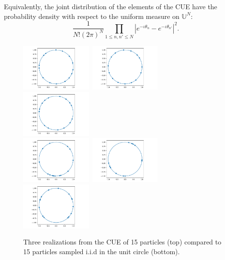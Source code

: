 \documentclass[twoside,11pt]{book}
\numberwithin{theorem}{chapter}
\numberwithin{definition}{chapter}
\numberwithin{proposition}{chapter}
\numberwithin{corollary}{chapter}
\numberwithin{example}{chapter}
\numberwithin{lemma}{chapter}
\begin{document}
Equivalently, the joint distribution of the elements of the CUE have the probability density with respect to the uniform measure on $\mathbb{U}^{N}$:
\begin{equation}\label{eq:haar_eigenvalues_density}
 \frac{1}{N!(2\pi)^{N}} \prod\limits_{1 \leq n,n' \leq N} |e^{-\iota \theta_{n}} - e^{-\iota \theta_{n'}}|^{2}.
\end{equation}

\begin{figure}
\centering
\includegraphics[width= 0.32\textwidth]{img/circle/CUE_design_N_15_fig_1.pdf}~\includegraphics[width= 0.32\textwidth]{img/circle/CUE_design_N_15_fig_2.pdf}
~\includegraphics[width= 0.32\textwidth]{img/circle/CUE_design_N_15_fig_3.pdf}\\
\includegraphics[width= 0.32\textwidth]{img/circle/iid_design_N_15_fig_1.pdf}~\includegraphics[width= 0.32\textwidth]{img/circle/iid_design_N_15_fig_2.pdf}
~\includegraphics[width= 0.32\textwidth]{img/circle/iid_design_N_15_fig_3.pdf}\\
\caption{Three realizations from the CUE of 15 particles (top) compared to 15 particles sampled i.i.d in the unit circle (bottom). \label{fig:cue_vs_iid_particles}}
\end{figure}
 
\end{document}
